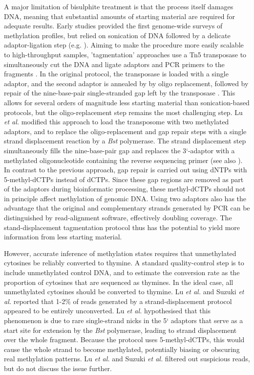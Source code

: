 \documentclass[10pt,letterpaper]{article}
\begin{document}
A major limitation of bisulphite treatment is that the process itself damages DNA, meaning that substantial amounts of starting material are required for adequate results.
Early studies provided the first genome-wide surveys of methylation profiles, but relied on sonication of DNA followed by a delicate adaptor-ligation step (e.g. \cite{meissner2005reduced, cokus2008shotgun, lister2009human}).
Aiming to make the procedure more easily scalable to high-throughput samples, 'tagmentation' approaches use a Tn5 transposase to simultaneously cut the DNA and ligate adaptors and PCR primers to the fragments \cite{wang2013tagmentation}.
In the original protocol, the transposase is loaded with a single adaptor, and the second adaptor is annealed by by oligo replacement, followed by repair of the nine-base-pair single-stranded gap left by the transposase \cite{adey2012ultra}.
This allows for several orders of magnitude less starting material than sonication-based protocols, but the oligo-replacement step remains the most challenging step.
Lu \textit{et al.} \cite{lu2015improved} modified this approach to load the transposome with two methylated adaptors, and to replace the oligo-replacement and gap repair steps with a single strand displacement reaction by a \textit{Bst} polymerase.
The strand displacement step simultaneously fills the nine-base-pair gap and replaces the 3`-adaptor with a methylated oligonucleotide containing the
reverse sequencing primer (see also \cite{weichenhan2019generation, suzuki2018whole}).
In contrast to the previous approach, gap repair is carried out using dNTPs with 5-methyl-dCTPs instead of dCTPs.
Since these gap regions are removed as part of the adaptors during bioinformatic processing, these methyl-dCTPs should not in principle affect methylation of genomic DNA.
Using two adaptors also has the advantage that the original and complementary strands generated by PCR can be distinguished by read-alignment software, effectively doubling coverage. 
The stand-displacement tagmentation protocol thus has the potential to yield more information from less starting material.

However, accurate inference of methylation states requires that unmethylated cytosines be reliably converted to thymine.
A standard quality-control step is to include unmethylated control DNA, and to estimate the conversion rate as the proportion of cytosines that are sequenced as thymines.
In the ideal case, all unmethylated cytosines should be converted to thymine.
Lu \textit{et al.} \cite{lu2015improved} and Suzuki \textit{et al.} \cite{suzuki2018whole} reported that 1-2\% of reads generated by a strand-displacement protocol appeared to be entirely unconverted.
Lu \textit{et al.} \cite{lu2015improved} hypothesised that this phenomenon is due to rare single-strand nicks in the 5` adaptors that serve as a start site for extension by the \textit{Bst} polymerase, leading to strand displacement over the whole fragment.
Because the protocol uses 5-methyl-dCTPs, this would cause the whole strand to become methylated, potentially biasing or obscuring real methylation patterns.
Lu \textit{et al.} \cite{lu2015improved} and Suzuki \textit{et al.} \cite{suzuki2018whole} filtered out suspicious reads, but do not discuss the issue further.
\end{document}
